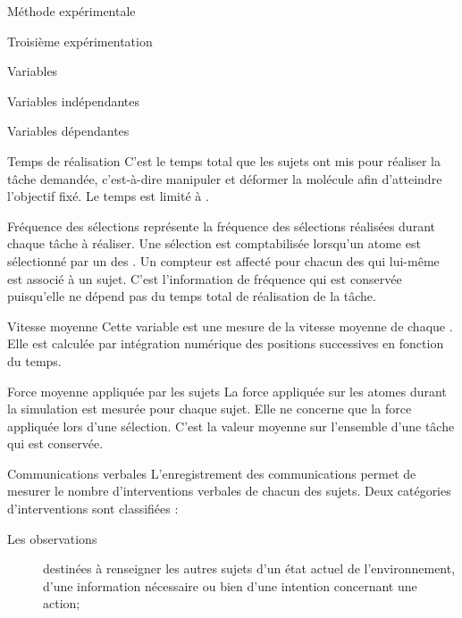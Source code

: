\documentclass[myfrancais]{mythesis}
\begin{document}
\begin{mychapter}{Méthode expérimentale}
\begin{mysection}{Troisième expérimentation}
\begin{mysubsection}{Variables}
\begin{mysubsubsection}{Variables indépendantes}
				\end{mysubsubsection}
				\begin{mysubsubsection}{Variables dépendantes}
					\begin{myparagraph}{ Temps de réalisation}
						C'est le temps total que les sujets ont mis pour réaliser la tâche demandée, c'est-à-dire manipuler et déformer la molécule afin d'atteindre l'objectif fixé.
						Le temps est limité à .
					\end{myparagraph}
					\begin{myparagraph}{ Fréquence des sélections}
						 représente la fréquence des sélections réalisées durant chaque tâche à réaliser.
						Une sélection est comptabilisée lorsqu'un atome est sélectionné par un des .
						Un compteur est affecté pour chacun des  qui lui-même est associé à un sujet.
						C'est l'information de fréquence qui est conservée puisqu'elle ne dépend pas du temps total de réalisation de la tâche.
					\end{myparagraph}
					\begin{myparagraph}{ Vitesse moyenne}
						Cette variable est une mesure de la vitesse moyenne de chaque .
						Elle est calculée par intégration numérique des positions successives en fonction du temps.
					\end{myparagraph}
					\begin{myparagraph}{ Force moyenne appliquée par les sujets}
						La force appliquée sur les atomes durant la simulation est mesurée pour chaque sujet.
						Elle ne concerne que la force appliquée lors d'une sélection.
						C'est la valeur moyenne sur l'ensemble d'une tâche qui est conservée.
					\end{myparagraph}
					\begin{myparagraph}{ Communications verbales}
						L'enregistrement des communications permet de mesurer le nombre d'interventions verbales de chacun des sujets.
						Deux catégories d'interventions sont classifiées :
						\begin{description}
							\item[Les observations] destinées à renseigner les autres sujets d'un état actuel de l'environnement, d'une information nécessaire ou bien d'une intention concernant une action;

\end{description}
\end{myparagraph}
\end{mysubsubsection}
\end{mysubsection}
\end{mysection}
\end{mychapter}
\end{document}
